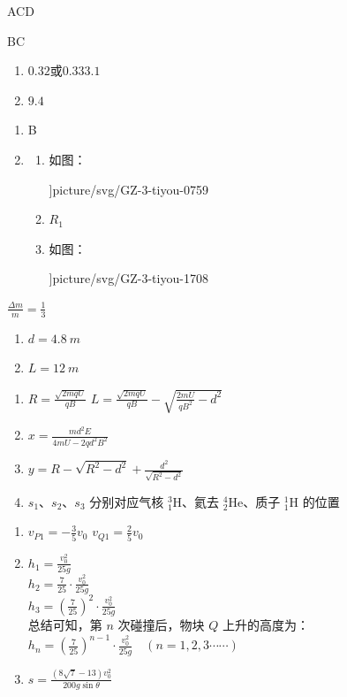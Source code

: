 \item ACD
\item BC
\item \begin {enumerate} \item $ 0.32 $或$ 0.33 $\quad $ 3.1 $ \item $ 9.4 $ \end {enumerate}
\item \begin {enumerate} \item B \item \begin {enumerate} \item 如图： \begin {center} \linewidth ]{picture/svg/GZ-3-tiyou-0759} \end {center} \item $ R_{1} $ \item 如图： \begin {center} \linewidth ]{picture/svg/GZ-3-tiyou-1708} \end {center} \end {enumerate} \end {enumerate}
\item $\frac {\Delta m}{m}=\frac {1}{3}$
\item \begin {enumerate} \item $d=4.8 \ m$ \item $L=12 \ m$ \end {enumerate}
\item \begin {enumerate} \item $R=\frac {\sqrt {2 m q U}}{q B}$ \quad $L=\frac {\sqrt {2 m q U}}{q B}-\sqrt {\frac {2 m U}{q B^{2}}-d^{2}}$ \item $x=\frac {m d^{2} E}{4 m U-2 q d^{2} B^{2}}$ \item $y=R-\sqrt {R^{2}-d^{2}}+\frac {d^{2}}{\sqrt {R^{2}-d^{2}}}$ \item $s_{1} $、$ s_{2}$、$ s_{3}$ 分别对应气核 ${ }_{1}^{3} \mathrm {H}$、氦去 ${ }_{2}^{4} \mathrm {He}$、质子 ${ }^{1}_{1} \mathrm {H}$ 的位置 \end {enumerate}
\item \begin {enumerate} \item $v_{P 1}=-\frac {3}{5} v_{0}$ \quad $v_{Q 1}=\frac {2}{5} v_{0}$ \item $h_{1}=\frac {v_{0}^{2}}{25 g}$ \\ $h_{2}=\frac {7}{25} \cdot \frac {v_{0}^{2}}{25 g}$ \\ $h_{3}=\left (\frac {7}{25}\right )^{2} \cdot \frac {v_{0}^{2}}{25 g}$\\ 总结可知，第 $n$ 次碰撞后，物块 $Q$ 上升的高度为：\\ $h_{n}=\left (\frac {7}{25}\right )^{n-1} \cdot \frac {v_{0}^{2}}{25 g} \quad (n=1,2,3 \cdots \cdots )$ \item $s=\frac {(8 \sqrt {7}-13) v_{0}^{2}}{200 g \sin \theta }$ \end {enumerate}
